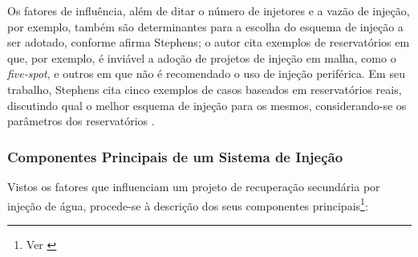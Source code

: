 Os fatores de influ\^{e}ncia, al\'{e}m de ditar o n\'{u}mero de injetores e a vaz\~{a}o de inje\c{c}\~{a}o, por exemplo, tamb\'{e}m s\~{a}o determinantes para a escolha do esquema de inje\c{c}\~{a}o a ser adotado, conforme afirma Stephens; o autor cita exemplos de reservat\'{o}rios em que, por exemplo, \'{e} invi\'{a}vel a ado\c{c}\~{a}o de projetos de inje\c{c}\~{a}o em malha, como o \textit{five-spot}, e outros em que n\~{a}o \'{e} recomendado o uso de inje\c{c}\~{a}o perif\'{e}rica. Em seu trabalho, Stephens cita cinco exemplos de casos baseados em reservat\'{o}rios reais, discutindo qual o melhor esquema de inje\c{c}\~{a}o para os mesmos, considerando-se os par\^{a}metros dos reservat\'{o}rios \cite{stephens1960}.

\subsubsection{Componentes Principais de um Sistema de Inje\c{c}\~{a}o}

Vistos os fatores que influenciam um projeto de recupera\c{c}\~{a}o secund\'{a}ria por inje\c{c}\~{a}o de \'{a}gua, procede-se \`{a} descri\c{c}\~{a}o dos seus componentes principais\footnote{Ver \cite[pp. 653-659]{engres}}:

